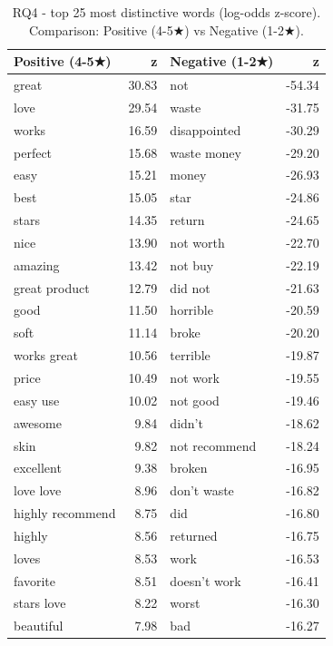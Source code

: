 \begin{table}[h]
\centering
\caption{RQ4 - top 25 most distinctive words (log-odds z-score). Comparison: Positive (4-5★) vs Negative (1-2★).}
\label{tab:rq4_beauty}
\begin{tabular}{lr|lr}
\toprule
\textbf{Positive (4-5★)} & z & \textbf{Negative (1-2★)} & z \\
\midrule
great & 30.83 & not & -54.34 \\
love & 29.54 & waste & -31.75 \\
works & 16.59 & disappointed & -30.29 \\
perfect & 15.68 & waste money & -29.20 \\
easy & 15.21 & money & -26.93 \\
best & 15.05 & star & -24.86 \\
stars & 14.35 & return & -24.65 \\
nice & 13.90 & not worth & -22.70 \\
amazing & 13.42 & not buy & -22.19 \\
great product & 12.79 & did not & -21.63 \\
good & 11.50 & horrible & -20.59 \\
soft & 11.14 & broke & -20.20 \\
works great & 10.56 & terrible & -19.87 \\
price & 10.49 & not work & -19.55 \\
easy use & 10.02 & not good & -19.46 \\
awesome & 9.84 & didn't & -18.62 \\
skin & 9.82 & not recommend & -18.24 \\
excellent & 9.38 & broken & -16.95 \\
love love & 8.96 & don't waste & -16.82 \\
highly recommend & 8.75 & did & -16.80 \\
highly & 8.56 & returned & -16.75 \\
loves & 8.53 & work & -16.53 \\
favorite & 8.51 & doesn't work & -16.41 \\
stars love & 8.22 & worst & -16.30 \\
beautiful & 7.98 & bad & -16.27 \\
\bottomrule
\end{tabular}
\end{table}